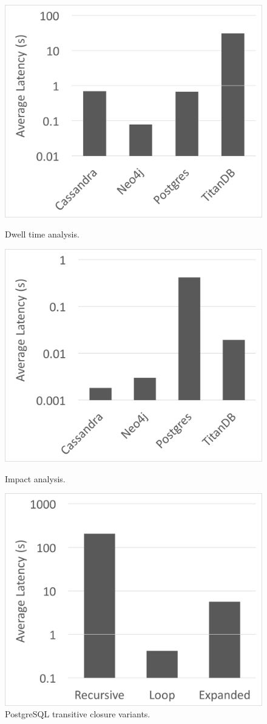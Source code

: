 \documentclass{sig-alternate}
\begin{document}
\begin{figure}
\centering
\begin{minipage}{.5\linewidth}
  \centering
  \includegraphics[width=\linewidth]{adjacent.png}
  \caption{Dwell time analysis.}
  \label{fig:dwell}
\end{minipage}%
\begin{minipage}{.5\linewidth}
  \centering
  \includegraphics[width=\linewidth]{trans_closure.png}
  \caption{Impact analysis.}
  \label{fig:impact}
  \end{minipage}
 \includegraphics[width=0.5\linewidth]{postgres.png}
  \caption{PostgreSQL transitive closure variants.}
  \label{fig:postgres}
\end{figure}
\end{document}
